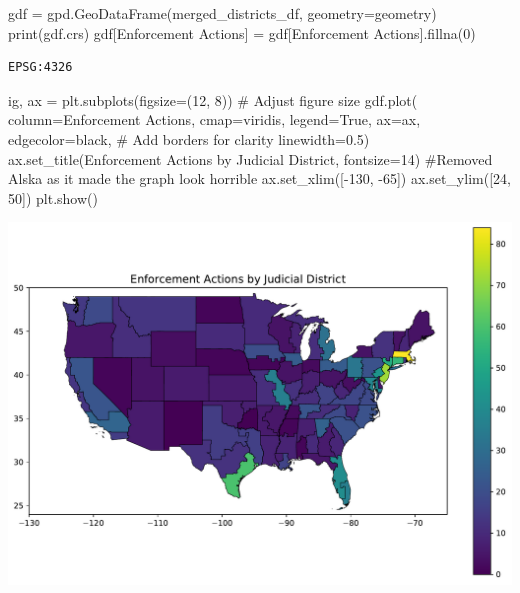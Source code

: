 \documentclass[
  letterpaper,
  DIV=11,
  numbers=noendperiod]{scrartcl}
\newenvironment{Shaded}{\begin{snugshade}}{\end{snugshade}}
\newcommand{\BuiltInTok}[1]{\textcolor[rgb]{0.00,0.23,0.31}{#1}}
\newcommand{\CommentTok}[1]{\textcolor[rgb]{0.37,0.37,0.37}{#1}}
\newcommand{\DecValTok}[1]{\textcolor[rgb]{0.68,0.00,0.00}{#1}}
\newcommand{\FloatTok}[1]{\textcolor[rgb]{0.68,0.00,0.00}{#1}}
\newcommand{\NormalTok}[1]{\textcolor[rgb]{0.00,0.23,0.31}{#1}}
\newcommand{\OperatorTok}[1]{\textcolor[rgb]{0.37,0.37,0.37}{#1}}
\newcommand{\StringTok}[1]{\textcolor[rgb]{0.13,0.47,0.30}{#1}}
\newcommand{\VariableTok}[1]{\textcolor[rgb]{0.07,0.07,0.07}{#1}}
\begin{document}
\begin{Shaded}
\begin{Highlighting}[]
\NormalTok{gdf }\OperatorTok{=}\NormalTok{ gpd.GeoDataFrame(merged\_districts\_df, geometry}\OperatorTok{=}\StringTok{\textquotesingle{}geometry\textquotesingle{}}\NormalTok{)}
\BuiltInTok{print}\NormalTok{(gdf.crs)}
\NormalTok{gdf[}\StringTok{\textquotesingle{}Enforcement Actions\textquotesingle{}}\NormalTok{] }\OperatorTok{=}\NormalTok{ gdf[}\StringTok{\textquotesingle{}Enforcement Actions\textquotesingle{}}\NormalTok{].fillna(}\DecValTok{0}\NormalTok{)}
\end{Highlighting}
\end{Shaded}

\begin{verbatim}
EPSG:4326
\end{verbatim}

\begin{Shaded}
\begin{Highlighting}[]
\NormalTok{ig, ax }\OperatorTok{=}\NormalTok{ plt.subplots(figsize}\OperatorTok{=}\NormalTok{(}\DecValTok{12}\NormalTok{, }\DecValTok{8}\NormalTok{))  }\CommentTok{\# Adjust figure size}
\NormalTok{gdf.plot(}
\NormalTok{    column}\OperatorTok{=}\StringTok{\textquotesingle{}Enforcement Actions\textquotesingle{}}\NormalTok{, }
\NormalTok{    cmap}\OperatorTok{=}\StringTok{\textquotesingle{}viridis\textquotesingle{}}\NormalTok{, }
\NormalTok{    legend}\OperatorTok{=}\VariableTok{True}\NormalTok{, }
\NormalTok{    ax}\OperatorTok{=}\NormalTok{ax,}
\NormalTok{    edgecolor}\OperatorTok{=}\StringTok{\textquotesingle{}black\textquotesingle{}}\NormalTok{,  }\CommentTok{\# Add borders for clarity}
\NormalTok{    linewidth}\OperatorTok{=}\FloatTok{0.5}\NormalTok{)}
\NormalTok{ax.set\_title(}\StringTok{\textquotesingle{}Enforcement Actions by Judicial District\textquotesingle{}}\NormalTok{, fontsize}\OperatorTok{=}\DecValTok{14}\NormalTok{)}
\CommentTok{\#Removed Alska as it made the graph look horrible}
\NormalTok{ax.set\_xlim([}\OperatorTok{{-}}\DecValTok{130}\NormalTok{, }\OperatorTok{{-}}\DecValTok{65}\NormalTok{])}
\NormalTok{ax.set\_ylim([}\DecValTok{24}\NormalTok{, }\DecValTok{50}\NormalTok{])}
\NormalTok{plt.show()}
\end{Highlighting}
\end{Shaded}

\includegraphics{ps5_files/figure-pdf/cell-31-output-1.pdf}
\end{document}
